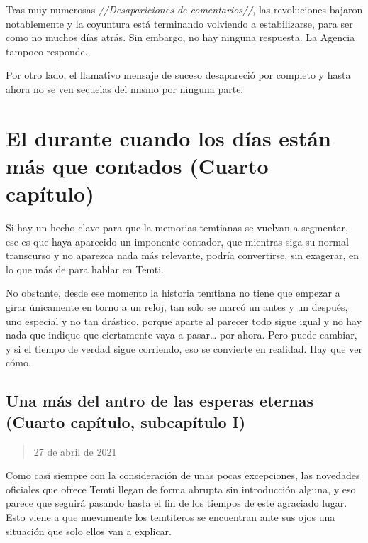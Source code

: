 \documentclass[
  spanish,
]{book}
\begin{document}
Tras muy numerosas \emph{//Desapariciones de comentarios//}, las revoluciones bajaron notablemente y la coyuntura está terminando volviendo a estabilizarse, para ser como no muchos días atrás.
Sin embargo, no hay ninguna respuesta. La Agencia tampoco responde.

Por otro lado, el llamativo mensaje de suceso desapareció por completo y hasta ahora no se ven secuelas del mismo por ninguna parte.

\hypertarget{el-durante-cuando-los-duxedas-estuxe1n-muxe1s-que-contados-cuarto-capuxedtulo}{%
\chapter{El durante cuando los días están más que contados (Cuarto capítulo)}\label{el-durante-cuando-los-duxedas-estuxe1n-muxe1s-que-contados-cuarto-capuxedtulo}}

Si hay un hecho clave para que la memorias temtianas se vuelvan a segmentar, ese es que haya aparecido un imponente contador, que mientras siga su normal transcurso y no aparezca nada más relevante, podría convertirse, sin exagerar, en lo que más de para hablar en Temti.

No obstante, desde ese momento la historia temtiana no tiene que empezar a girar únicamente en torno a un reloj, tan solo se marcó un antes y un después, uno especial y no tan drástico, porque aparte al parecer todo sigue igual y no hay nada que indique que ciertamente vaya a pasar\ldots{} por ahora.
Pero puede cambiar, y si el tiempo de verdad sigue corriendo, eso se convierte en realidad. Hay que ver cómo.

\hypertarget{una-muxe1s-del-antro-de-las-esperas-eternas-cuarto-capuxedtulo-subcapuxedtulo-i}{%
\section{Una más del antro de las esperas eternas (Cuarto capítulo, subcapítulo I)}\label{una-muxe1s-del-antro-de-las-esperas-eternas-cuarto-capuxedtulo-subcapuxedtulo-i}}

\begin{quote}
27 de abril de 2021
\end{quote}

Como casi siempre con la consideración de unas pocas excepciones, las novedades oficiales que ofrece Temti llegan de forma abrupta sin introducción alguna, y eso parece que seguirá pasando hasta el fin de los tiempos de este agraciado lugar.
Esto viene a que nuevamente los temtiteros se encuentran ante sus ojos una situación que solo ellos van a explicar.
\end{document}
